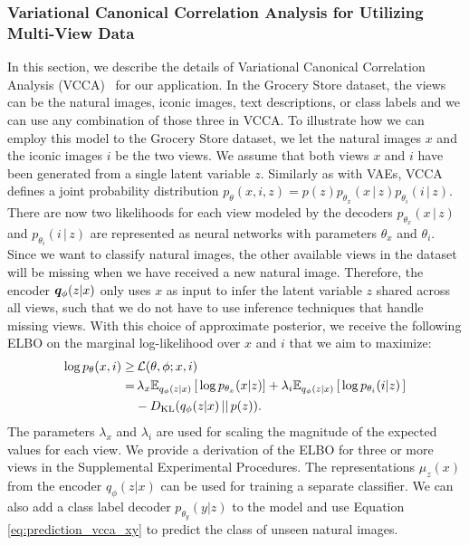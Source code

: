 \subsubsection{Variational Canonical Correlation Analysis for Utilizing Multi-View Data}
\label{paperB:sec:utilizing_additional_information}

In this section, we describe the details of Variational Canonical Correlation Analysis (VCCA)~ for our application. In the Grocery Store dataset, the views can be the natural images, iconic images, text descriptions, or class labels and we can use any combination of those three in VCCA. To illustrate how we can employ this model to the Grocery Store dataset, we let the natural images $x$ and the iconic images $i$ be the two views.  
We assume that both views $x$ and $i$ have been generated from a single latent variable $z$. Similarly as with VAEs, VCCA defines a joint probability distribution $p_{\theta}(x, i, z) = p(z)p_{\theta_{x}}(x\,|\,z)p_{\theta_{i}}(i\,|\,z)$. There are now two likelihoods for each view modeled by the decoders $p_{\theta_{x}}(x\,|\,z)$ and $p_{\theta_{i}}(i\,|\,z)$ are represented as neural networks with parameters $\theta_{x}$ and $\theta_{i}$. 
Since we want to classify natural images, the other available views in the dataset will be missing when we have received a new natural image. Therefore, the encoder ${\bm{q}}_{\phi}(z | x)$ only uses $x$ as input to infer the latent variable $z$ shared across all views, such that we do not have to use inference techniques that handle missing views. With this choice of approximate posterior, we receive the following ELBO on the marginal log-likelihood over $x$ and $i$ that we aim to maximize:
\begin{align}\label{eq:loss_vcca}
    \begin{split}
        \log p_{\theta}(x, i) \geq & \, \mathcal{L}(\theta, \phi; x, i) \\ 
        = & \,  \lambda_{x} \mathbb{E}_{q_{\phi}(z|x)}\left[\, \log p_{\theta_{x}}(x | z) \right] + \lambda_{i} \mathbb{E}_{q_{\phi}(z|x)}\left[\, \log p_{\theta_{i}}(i | z) \,\right] \\ 
        & - D_{\mathrm{KL}}(q_{\phi}(z|x)\,||\,p(z)) .
    \end{split}
\end{align}  
The parameters $\lambda_{x}$ and $\lambda_{i}$ are used for scaling the magnitude of the expected values for each view. 
We provide a derivation of the ELBO for three or more views in the Supplemental Experimental Procedures.
The representations $\mu_{z}(x)$ from the encoder $q_{\phi}(z|x)$ can be used for training a separate classifier. We can also add a class label decoder $p_{\theta_{y}}(y | z)$ to the model and use Equation \ref{eq:prediction_vcca_xy} to predict the class of unseen natural images.


